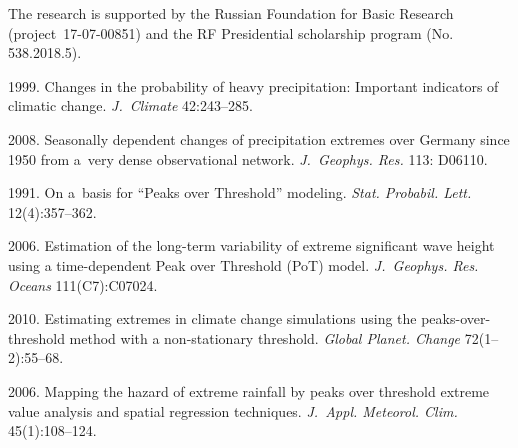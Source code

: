 


\vspace*{-18pt}

\Ack
\noindent
The research is supported by the Russian Foundation 
for Basic Research (project~17-07-00851) and the 
RF Presidential scholarship program (No.\,538.2018.5).



  \begin{multicols}{2}

\renewcommand{\bibname}{\protect\rmfamily References}

{\small\frenchspacing
 {%
 \begin{thebibliography}{99}
 1999. Changes
in the probability of heavy precipitation: Important indicators of climatic change. 
\textit{J.~Climate} 42:243--285.

2008. Seasonally dependent changes of precipitation extremes over Germany 
since 1950 from a~very dense observational network. 
\textit{J.~Geophys. Res.} 113: D06110.

 1991. 
On a~basis for ``Peaks over Threshold'' modeling. 
\textit{Stat. Probabil. Lett.} 12(4):357--362.

 2006. Estimation of the long-term variability of extreme significant wave 
 height using a time-dependent Peak over Threshold (PoT) model. \textit{J.~Geophys. 
 Res. Oceans} 111(C7):C07024.

 2010. 
Estimating extremes in climate change simulations using the peaks-over-threshold 
method with a non-stationary threshold. 
\textit{Global Planet. Change} 72(1--2):55--68.

 2006. Mapping the hazard 
of extreme rainfall by peaks over threshold extreme value analysis and 
spatial regression techniques. \textit{J.~Appl. Meteorol. Clim.} 
45(1):108--124.


\end{thebibliography}}}
\end{multicols}

